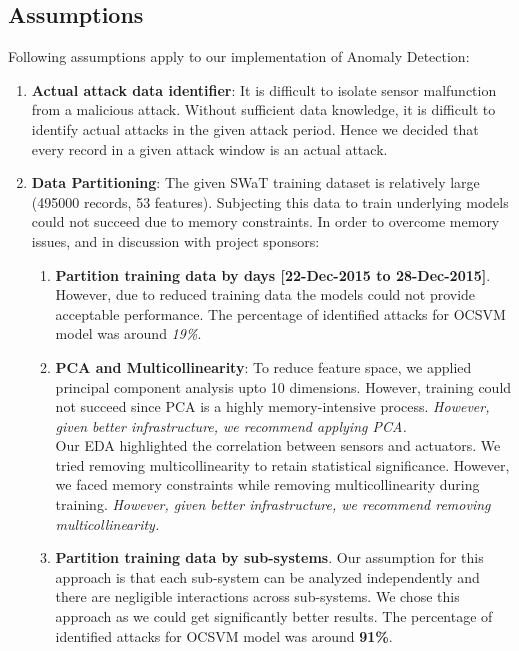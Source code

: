 \documentclass{article}
\begin{document}
\subsection{Assumptions} \label{Assumptions}
Following assumptions apply to our implementation of Anomaly Detection:
\begin{enumerate}
    \item \textbf{Actual attack data identifier}: It is difficult to isolate sensor malfunction from a malicious attack. Without sufficient data knowledge, it is difficult to identify actual attacks in the given attack period. Hence we decided that every record in a given attack window is an actual attack.

    \item \textbf{Data Partitioning}: The given SWaT training dataset is relatively large (495000 records, 53 features). Subjecting this data to train underlying models could not succeed due to memory constraints. 
    In order to overcome memory issues, and in discussion with project sponsors: 
    \begin{enumerate}
        \item \textbf{Partition training data by days [22-Dec-2015 to 28-Dec-2015]}. However, due to reduced training data the models could not provide acceptable performance. The percentage of identified attacks for OCSVM model was around \textit{19\%}.
        \item \textbf{PCA and Multicollinearity}: To reduce feature space, we applied principal component analysis upto 10 dimensions. However, training could not succeed since PCA is a highly memory-intensive process. \textit{However, given better infrastructure, we recommend applying PCA.} \\
        Our EDA highlighted the correlation between sensors and actuators. We tried removing multicollinearity to retain statistical significance. However, we faced memory constraints while removing multicollinearity during training. \textit{However, given better infrastructure, we recommend removing multicollinearity.}
        
        \item \textbf{Partition training data by sub-systems}. Our assumption for this approach is that each sub-system can be analyzed independently and there are negligible interactions across sub-systems. We chose this approach as we could get significantly better results. The percentage of identified attacks for OCSVM model was around \textbf{91\%}.          
    \end{enumerate} 
    

\end{enumerate}
\end{document}
